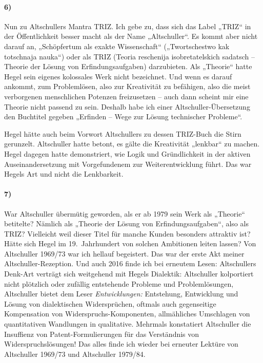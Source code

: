 \documentclass[12pt,a4paper]{article}
\begin{document}
\paragraph{6)} 
Nun zu Altschullers Mantra TRIZ. Ich gebe zu, dass sich das Label „TRIZ“ in der
Öffentlichkeit besser macht als der Name „Altschuller“. Es kommt aber nicht
darauf an, „Schöpfertum als exakte Wissenschaft“ („Twortschestwo kak totschnaja
nauka“) oder als TRIZ (Teoria reschenija isobretatelskich sadatsch – Theorie
der Lösung von Erfindungsaufgaben) darzubieten. Als „Theorie“ hatte Hegel sein
eigenes kolossales Werk nicht bezeichnet. Und wenn es darauf ankommt, zum
Problemlösen, also zur Kreativität zu befähigen, also die meist verborgenen
menschlichen Potenzen freizusetzen – auch dann scheint mir eine Theorie nicht
passend zu sein. Deshalb habe ich einer Altschuller-Übersetzung den Buchtitel
gegeben „Erfinden – Wege zur Lösung technischer Probleme“.

Hegel hätte auch beim Vorwort Altschullers zu dessen TRIZ-Buch die Stirn
gerunzelt. Altschuller hatte betont, es gälte die Kreativität „lenkbar“ zu
machen. Hegel dagegen hatte demonstriert, wie Logik und Gründlichkeit in der
aktiven Auseinandersetzung mit Vorgefundenem zur Weiterentwicklung führt. Das
war Hegels Art und nicht die Lenkbarkeit.

\paragraph{7)} 
War Altschuller übermütig geworden, als er ab 1979 sein Werk als „Theorie“
betitelte? Nämlich als „Theorie der Lösung von Erfindungsaufgaben“, also als
TRIZ? Vielleicht weil dieser Titel für manche Kunden besonders attraktiv ist?
Hätte sich Hegel im 19.~Jahrhundert von solchen Ambitionen leiten lassen? Von
Altschuller 1969/73 war ich hellauf begeistert. Das war der erste Akt meiner
Altschuller-Rezeption. Und auch 2016 finde ich bei erneutem Lesen: Altschullers
Denk-Art verträgt sich weitgehend mit Hegels Dialektik: Altschuller kolportiert
nicht plötzlich oder zufällig entstehende Probleme und Problemlösungen,
Altschuller bietet dem Leser \emph{Entwicklungen:} Entstehung, Entwicklung und
Lösung von dialektischen Widersprüchen, oftmals auch gegenseitige Kompensation
von Widerspruchs-Komponenten, allmähliches Umschlagen von quantitativen
Wandlungen in qualitative. Mehrmals konstatiert Altschuller die Insuffienz von
Patent-Formulierungen für das Verständnis von Widerspruchslösungen! Das alles
finde ich wieder bei erneuter Lektüre von Altschuller 1969/73 und Altschuller
1979/84.
\end{document}
